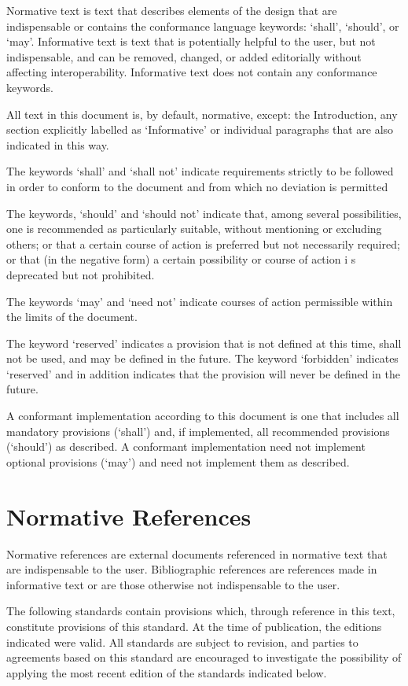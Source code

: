 Normative text is text that describes elements of  
the design that are indispensable or contains the 
conformance language keywords: `shall', `should', or `may'. 
Informative text is text that is potentially helpful to the user, 
but not indispensable, and can be removed, changed, or added 
editorially without affecting interoperability. Informative 
text does not contain any conformance keywords.

All text in this document is, by default, normative, 
except: the Introduction, any section explicitly labelled as `Informative' 
or individual paragraphs that are also indicated in this way.

The keywords `shall' and `shall not' indicate requirements 
strictly to be followed in order to conform to the document 
and from which no deviation is permitted

The keywords, `should' and `should not' indicate that, among 
several possibilities, one is recommended as particularly suitable, 
without mentioning or excluding others; or that a certain course 
of action is preferred but not necessarily required; or that 
(in the negative form) a certain possibility or course of action i
s deprecated but not prohibited.

The keywords `may' and `need not' indicate courses of action 
permissible within the limits of the document.

The keyword `reserved' indicates a provision that is not 
defined at this time, shall not be used, and may be defined 
in the future. The keyword `forbidden' indicates `reserved' and in
 addition indicates that the provision will never be defined in the future.

A conformant implementation according to this document is one that includes 
all mandatory provisions (`shall') and, if implemented, all recommended 
provisions (`should') as described. A conformant implementation need 
not implement optional provisions (`may') and need not implement them as described.

\section{Normative References}
Normative references are external documents referenced in normative 
text that are indispensable to the user. Bibliographic references 
are references made in informative text or are those otherwise not 
 indispensable to the user.

The following standards contain provisions which, through
 reference in this text, constitute provisions of this standard. 
 At the time of publication, the editions indicated were valid.
 All standards are subject to revision, and parties to agreements
  based on this standard are encouraged to investigate the
  possibility of applying the most recent edition of the standards indicated below.

